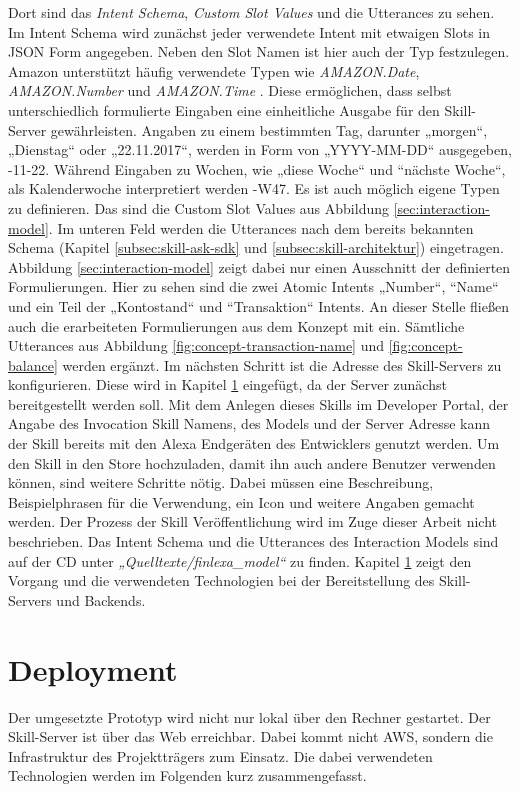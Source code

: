 Dort sind das \textit{Intent Schema}, \textit{Custom Slot Values} und die Utterances zu sehen. Im Intent Schema wird zunächst jeder verwendete Intent mit etwaigen Slots in \ac{JSON} Form angegeben. Neben den Slot Namen ist hier auch der Typ festzulegen. Amazon unterstützt häufig verwendete Typen wie \zB \textit{AMAZON.Date}, \textit{AMAZON.Number} und \textit{AMAZON.Time} \cite{alexa-slot-types}. Diese ermöglichen, dass selbst unterschiedlich formulierte Eingaben eine einheitliche Ausgabe für den Skill-Server gewährleisten. Angaben zu einem bestimmten Tag, darunter „morgen“, „Dienstag“ oder „22.11.2017“, werden in Form von „YYYY-MM-DD“ ausgegeben, -11-22. Während Eingaben zu Wochen, wie „diese Woche“ und “nächste Woche“, als Kalenderwoche interpretiert werden -W47. Es ist auch möglich eigene Typen zu definieren. Das sind die Custom Slot Values aus Abbildung \ref{sec:interaction-model}. Im unteren Feld werden die Utterances nach dem bereits bekannten Schema (\vgl Kapitel \ref{subsec:skill-ask-sdk} und \ref{subsec:skill-architektur}) eingetragen. Abbildung \ref{sec:interaction-model} zeigt dabei nur einen Ausschnitt der definierten Formulierungen. Hier zu sehen sind die zwei Atomic Intents „Number“, “Name“ und ein Teil der „Kontostand“ und “Transaktion“ Intents. An dieser Stelle fließen auch die erarbeiteten Formulierungen aus dem Konzept mit ein. Sämtliche Utterances aus Abbildung \ref{fig:concept-transaction-name} und \ref{fig:concept-balance} werden ergänzt. Im nächsten Schritt ist die Adresse des Skill-Servers zu konfigurieren. Diese wird in Kapitel \ref{sec:deployment} eingefügt, da der Server zunächst bereitgestellt werden soll. Mit dem Anlegen dieses Skills im Developer Portal, der Angabe des Invocation \bzw Skill Namens, des Models und der Server Adresse kann der Skill bereits mit den Alexa Endgeräten des Entwicklers genutzt werden. Um den Skill in den Store hochzuladen, damit ihn auch andere Benutzer verwenden können, sind weitere Schritte nötig. Dabei müssen eine Beschreibung, Beispielphrasen für die Verwendung, ein Icon und weitere Angaben gemacht werden. Der Prozess der Skill Veröffentlichung wird im Zuge dieser Arbeit nicht beschrieben. Das Intent Schema und die Utterances des Interaction Models sind auf der CD unter \textit{„Quelltexte/finlexa\_model“} zu finden. Kapitel \ref{sec:deployment} zeigt den Vorgang und die verwendeten Technologien bei der Bereitstellung des Skill-Servers und Backends.

\section{Deployment}
\label{sec:deployment}
Der umgesetzte Prototyp wird nicht nur lokal über den Rechner gestartet. Der Skill-Server ist über das Web erreichbar. Dabei kommt nicht \ac{AWS}, sondern die Infrastruktur des Projektträgers zum Einsatz. Die dabei verwendeten Technologien werden im Folgenden kurz zusammengefasst.

